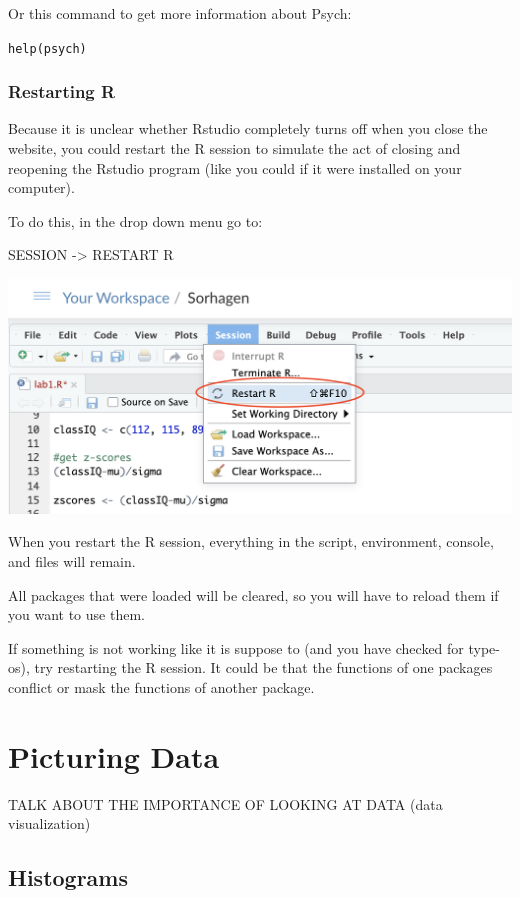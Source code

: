 \documentclass[
]{book}
\begin{document}
Or this command to get more information about Psych:

\texttt{help(psych)}

\hypertarget{restarting-r}{%
\subsection{Restarting R}\label{restarting-r}}

Because it is unclear whether Rstudio completely turns off when you close the website, you could restart the R session to simulate the act of closing and reopening the Rstudio program (like you could if it were installed on your computer).

To do this, in the drop down menu go to:

SESSION -\textgreater{} RESTART R

\includegraphics{img/restart.png}

When you restart the R session, everything in the script, environment, console, and files will remain.

All packages that were loaded will be cleared, so you will have to reload them if you want to use them.

If something is not working like it is suppose to (and you have checked for type-os), try restarting the R session. It could be that the functions of one packages conflict or mask the functions of another package.

\hypertarget{picturing-data}{%
\chapter{Picturing Data}\label{picturing-data}}

TALK ABOUT THE IMPORTANCE OF LOOKING AT DATA (data visualization)

\hypertarget{histograms}{%
\section{Histograms}\label{histograms}}
\end{document}
